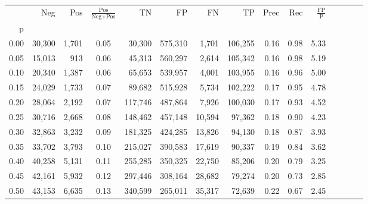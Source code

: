 \begin{tabular}{rrrcrrrrrrrrrrr}
\toprule
{} &     Neg &    Pos & $\frac{\text{Pos}}{\text{Neg}+\text{Pos}}$ &       TN &       FP &       FN &       TP &  Prec &   Rec & $\frac{\text{FP}}{\text{P}}$ \\
p    &         &        &                                            &          &          &          &          &       &       &                              \\
\midrule
0.00 &  30,300 &  1,701 &                                       0.05 &   30,300 &  575,310 &    1,701 &  106,255 &  0.16 &  0.98 &                         5.33 \\
0.05 &  15,013 &    913 &                                       0.06 &   45,313 &  560,297 &    2,614 &  105,342 &  0.16 &  0.98 &                         5.19 \\
0.10 &  20,340 &  1,387 &                                       0.06 &   65,653 &  539,957 &    4,001 &  103,955 &  0.16 &  0.96 &                         5.00 \\
0.15 &  24,029 &  1,733 &                                       0.07 &   89,682 &  515,928 &    5,734 &  102,222 &  0.17 &  0.95 &                         4.78 \\
0.20 &  28,064 &  2,192 &                                       0.07 &  117,746 &  487,864 &    7,926 &  100,030 &  0.17 &  0.93 &                         4.52 \\
0.25 &  30,716 &  2,668 &                                       0.08 &  148,462 &  457,148 &   10,594 &   97,362 &  0.18 &  0.90 &                         4.23 \\
0.30 &  32,863 &  3,232 &                                       0.09 &  181,325 &  424,285 &   13,826 &   94,130 &  0.18 &  0.87 &                         3.93 \\
0.35 &  33,702 &  3,793 &                                       0.10 &  215,027 &  390,583 &   17,619 &   90,337 &  0.19 &  0.84 &                         3.62 \\
0.40 &  40,258 &  5,131 &                                       0.11 &  255,285 &  350,325 &   22,750 &   85,206 &  0.20 &  0.79 &                         3.25 \\
0.45 &  42,161 &  5,932 &                                       0.12 &  297,446 &  308,164 &   28,682 &   79,274 &  0.20 &  0.73 &                         2.85 \\
0.50 &  43,153 &  6,635 &                                       0.13 &  340,599 &  265,011 &   35,317 &   72,639 &  0.22 &  0.67 &                         2.45 \\

\end{tabular}
